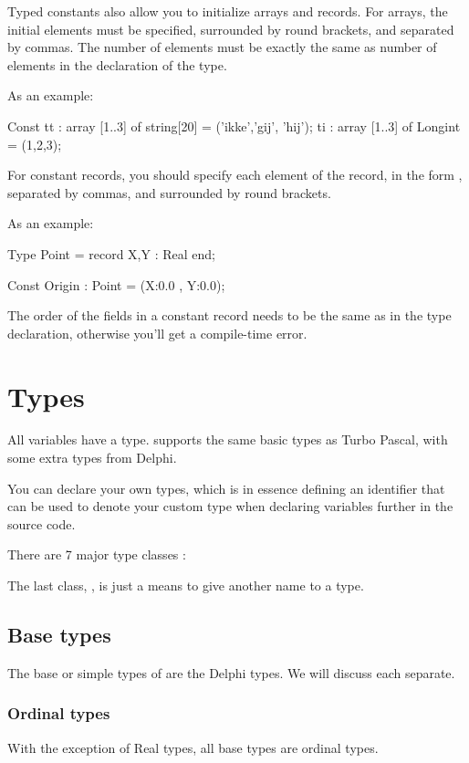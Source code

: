 \documentclass{report}
\begin{document}
Typed constants also allow you to initialize arrays and records. For arrays,
the initial elements must be specified, surrounded by round brackets, and
separated by commas. The number of elements must be exactly the same as
number of elements in the declaration of the type. 

As an example:
\begin{listing}
Const 
  tt : array [1..3] of string[20] = ('ikke','gij', 'hij');
  ti : array [1..3] of Longint = (1,2,3);
\end{listing}

For constant records, you should specify each element of the record, in the
form , separated by commas, and surrounded by round
brackets.

As an example:
\begin{listing}
Type 
  Point = record
    X,Y : Real
    end;

Const
  Origin : Point = (X:0.0 , Y:0.0); 
\end{listing}
The order of the fields in a constant record needs to be the same as in the type declaration,
otherwise you'll get a compile-time error.

\chapter{Types}

All variables have a type. \fpc supports the same basic types as Turbo
Pascal, with some extra types from Delphi.

You can declare your own types, which is in essence defining an identifier
that can be used to denote your custom type when declaring variables further
in the source code.



There are 7 major type classes :



The last class, , is just a means to give another name to a
type.

\section{Base types}
The base or simple types of \fpc are the Delphi types. 
We will discuss each separate. 


\subsection{Ordinal types}
With the exception of Real types, all base types are ordinal types.
\end{document}
